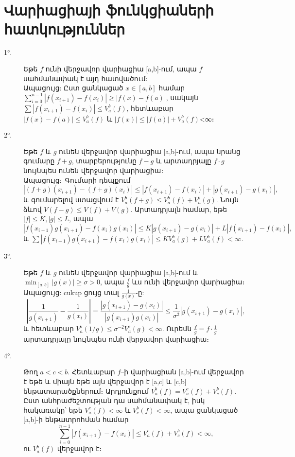 \documentclass[12pt]{article}
\begin{document}
\section{Վարիացիայի ֆունկցիաների հատկություններ}
\begin{description}
\item[1°.] Եթե \(f\) ունի վերջավոր վարիացիա [a,b]-ում, ապա \(f\) սահմանափակ է այդ հատվածում։
\\
Ապացույց: Ըստ ցանկացած \(x\in[a,b]\) համար
\(\sum_{i=0}^{n-1}|f(x_{i+1})-f(x_i)| \ge |f(x)-f(a)|\),
սակայն \(\sum|f(x_{i+1})-f(x_i)| \le V_a^b(f)\), հետևաբար \(|f(x)-f(a)|\le V_a^b(f)\) և \(|f(x)|\le |f(a)|+V_a^b(f)\)<∞։
\item[2°.] Եթե \(f\) և \(g\) ունեն վերջավոր վարիացիա [a,b]-ում, ապա նրանց գումարը \(f+g\), տարբերությունը \(f-g\) և արտադրյալը \(f\cdot g\) նույնպես ունեն վերջավոր վարիացիա։
\\
Ապացույց\(:\) Գումարի դեպքում
\[
|(f+g)(x_{i+1})-(f+g)(x_i)| \le |f(x_{i+1})-f(x_i)| + |g(x_{i+1})-g(x_i)|,
\]
և գումարելով ստացվում է \(V_a^b(f+g)\le V_a^b(f)+V_a^b(g)\). Նույն ձևով \(V(f-g)\le V(f)+V(g)\). Արտադրյալն համար, եթե \(|f|\le K, |g|\le L\), ապա
\[
|f(x_{i+1})g(x_{i+1}) - f(x_i)g(x_i)| \le K|g(x_{i+1})-g(x_i)| + L|f(x_{i+1})-f(x_i)|,
\]
և \(\sum |f(x_{i+1})g(x_{i+1}) - f(x_i)g(x_i)| \le K V_a^b(g) + L V_a^b(f) < \infty\).
\item[3°.] Եթե \(f\) և \(g\) ունեն վերջավոր վարիացիա [a,b]-ում և \(\min_{[a,b]}|g(x)|\ge\sigma>0\), ապա \(\frac{f}{g}\) ևս ունի վերջավոր վարիացիա։
\\
Ապացույց: cukup ցույց տալ \(\frac{1}{g(x)}\)-ը:
\[
\left|\frac{1}{g(x_{i+1})}-\frac{1}{g(x_i)}\right| = \frac{|g(x_{i+1})-g(x_i)|}{|g(x_{i+1})g(x_i)|} \le \frac{1}{\sigma^2}|g(x_{i+1})-g(x_i)|,
\]
և հետևաբար \(V_a^b(1/g)\le \sigma^{-2}V_a^b(g)<\infty\). Ուրեմն \(\frac{f}{g}=f\cdot\frac1g\) արտադրյալը նույնպես ունի վերջավոր վարիացիա։
\item[4°.] Թող \(a<c<b\). Հետևաբար \(f\)–ի վարիացիան [a,b]-ում վերջավոր է եթե և միայն եթե այն վերջավոր է [a,c] և [c,b] ենթատարածքներում։ Արդյունքում \(V_a^b(f)=V_a^c(f)+V_c^b(f)\).
Ըստ անհրաժեշտության դա սահմանափակ է, իսկ հակառակը՝ եթե \(V_a^c(f)<\infty\) և \(V_c^b(f)<\infty\), ապա ցանկացած [a,b]-ի ենթատրոհման համար
\[
\sum_{i=0}^{n-1}|f(x_{i+1})-f(x_i)| \le V_a^c(f) + V_c^b(f)<\infty,
\]
ու \(V_a^b(f)\) վերջավոր է։
\end{description}
\end{document}
